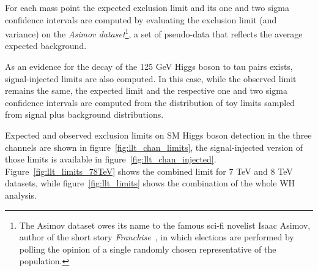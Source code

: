 For each mass point the expected exclusion limit and its one and two sigma confidence intervals are computed  by evaluating the exclusion limit (and variance) on the \emph{Asimov dataset}\footnote{The Asimov dataset owes its name to the famous sci-fi novelist Isaac Asimov, author of the short story \emph{Franchise}~\cite{franchise}, in which elections are performed by polling the opinion of a single randomly chosen representative of the population.}, a set of pseudo-data that reflects the average expected background. 

As an evidence for the decay of the 125 GeV Higgs boson to tau pairs exists, signal-injected limits are also computed. In this case, while the observed limit remains the same, the expected limit and the respective one and two sigma confidence intervals are computed from the distribution of toy limits sampled from signal plus background distributions.

Expected and observed exclusion limits on SM Higgs boson detection in the three channels are shown in figure~\ref{fig:llt_chan_limits}, the signal-injected version of those limits is available in figure~\ref{fig:llt_chan_injected}. Figure~\ref{fig:llt_limits_78TeV} shows the combined limit for 7 TeV and 8 TeV datasets, while figure~\ref{fig:llt_limits} shows the combination of the whole WH analysis.


